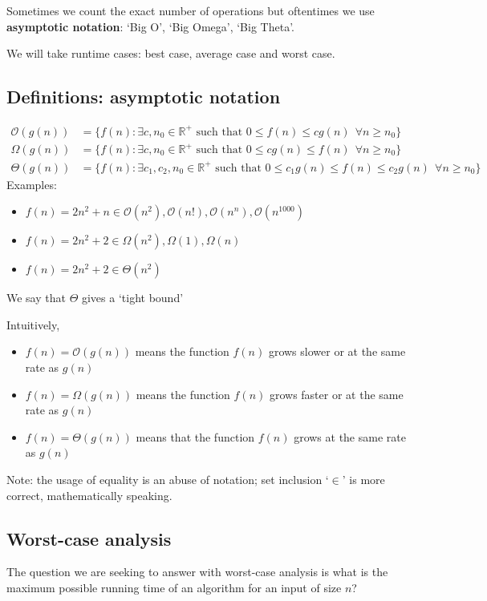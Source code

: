 \documentclass[11pt]{article}
\newcommand{\R}{\mathbb{R}}
\begin{document}
Sometimes we count the exact number of operations but oftentimes we use \textbf{asymptotic notation}: `Big O', `Big Omega', `Big Theta'. 

We will take runtime cases: best case, average case and worst case. 

\subsection{Definitions: asymptotic notation}
\begin{align*}
    \mathcal{O}(g(n)) &= \{ f(n): \exists c, n_0 \in \R^+ \text{ such that } 0 \leq f(n) \leq cg(n) ~~\forall n \geq n_0 \} \\
    \Omega(g(n)) &= \{ f(n): \exists c, n_0 \in \R^+ \text{ such that } 0 \leq cg(n) \leq f(n) ~~ \forall n \geq n_0 \} \\
    \Theta(g(n)) &= \{ f(n): \exists c_1, c_2, n_0 \in \R^+ \text{ such that } 0 \leq c_1g(n) \leq f(n) \leq c_2g(n) ~~ \forall n \geq n_0 \}
\end{align*}
Examples: 
\begin{itemize}
    \item $f(n) = 2n^2 + n \in \mathcal{O}(n^2), \mathcal{O}(n!), \mathcal{O}(n^n), \mathcal{O}(n^{1000})$
    \item $f(n) = 2n^2 + 2 \in \Omega(n^2), \Omega(1), \Omega(n)$
    \item $f(n) = 2n^2 + 2 \in \Theta(n^2)$
\end{itemize}
We say that $\Theta$ gives a `tight bound'

Intuitively,
\begin{itemize}
    \item $f(n) = \mathcal{O}(g(n))$ means the function $f(n)$ grows slower or at the same rate as $g(n)$ 
    \item $f(n) = \Omega(g(n))$ means  the function $f(n)$ grows faster or at the same rate as $g(n)$
    \item $f(n) = \Theta(g(n))$ means that the function $f(n)$ grows at the same rate as $g(n)$
\end{itemize}
Note: the usage of equality is an abuse of notation; set inclusion `$\in$' is more correct, mathematically speaking. 

\subsection{Worst-case analysis}
The question we are seeking to answer with worst-case analysis is what is the maximum possible running time of an algorithm for an input of size $n$?
\end{document}
